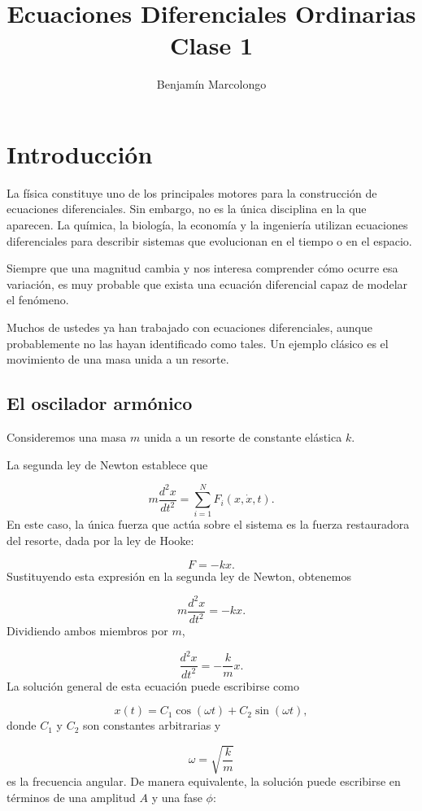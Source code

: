 \documentclass[12pt,a4paper]{article}
\title{Ecuaciones Diferenciales Ordinarias\\Clase 1}
\author{Benjamín Marcolongo}
\date{}
\begin{document}
	
	\maketitle
	
	
	\section{Introducción}
	
	La física constituye uno de los principales motores para la construcción de ecuaciones diferenciales. Sin embargo, no es la única disciplina en la que aparecen. La química, la biología, la economía y la ingeniería utilizan ecuaciones diferenciales para describir sistemas que evolucionan en el tiempo o en el espacio.
	
	Siempre que una magnitud cambia y nos interesa comprender cómo ocurre esa variación, es muy probable que exista una ecuación diferencial capaz de modelar el fenómeno.
	
	Muchos de ustedes ya han trabajado con ecuaciones diferenciales, aunque probablemente no las hayan identificado como tales. Un ejemplo clásico es el movimiento de una masa unida a un resorte.
	
	\subsection{El oscilador armónico}
	
	Consideremos una masa \(m\) unida a un resorte de constante elástica \(k\).
	
	La segunda ley de Newton establece que
	
	\[
	m\frac{d^2x}{dt^2}=\sum_{i=1}^{N}F_i(x,\dot{x},t).
	\]
	En este caso, la única fuerza que actúa sobre el sistema es la fuerza restauradora del resorte, dada por la ley de Hooke:
	
	\[
	F=-kx.
	\]
	Sustituyendo esta expresión en la segunda ley de Newton, obtenemos
	
	\[
	m\frac{d^2x}{dt^2}=-kx.
	\]
	Dividiendo ambos miembros por \(m\),
	
	\[
	\frac{d^2x}{dt^2}=-\frac{k}{m}x.
	\]
	La solución general de esta ecuación puede escribirse como
	
	\[
	x(t)=C_1\cos(\omega t)+C_2\sin(\omega t),
	\]
	donde \(C_1\) y \(C_2\) son constantes arbitrarias y
	
	\[
	\omega=\sqrt{\frac{k}{m}}
	\]
	es la frecuencia angular. De manera equivalente, la solución puede escribirse en términos de una amplitud \(A\) y una fase \(\phi\):
	
\end{document}
